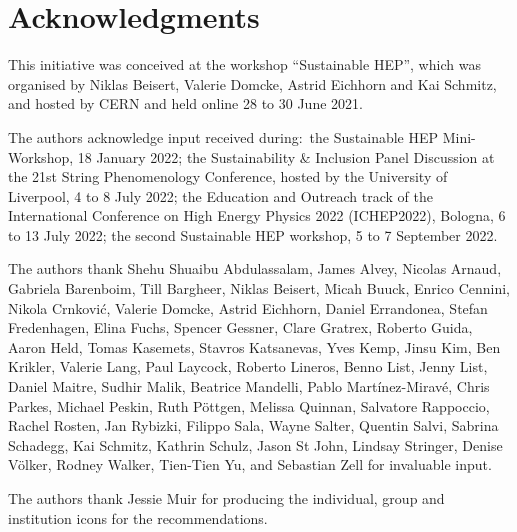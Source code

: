 \documentclass[../SustainableHEP.tex]{subfiles}
\begin{document}
\newpage


\section*{Acknowledgments}
\label{sec:Acknowledgments}
\RaggedRight
\sloppy

This initiative was conceived at the workshop “Sustainable HEP”, which was organised by Niklas Beisert, Valerie Domcke, Astrid Eichhorn and Kai Schmitz, and hosted by CERN and held online 28 to 30 June 2021.

The authors acknowledge input received during:~the Sustainable HEP Mini-Workshop, 18 January 2022; the Sustainability \& Inclusion Panel Discussion at the 21st String Phenomenology Conference, hosted by the University of Liverpool, 4 to 8 July 2022; the Education and Outreach track of the International Conference on High Energy Physics 2022 (ICHEP2022), Bologna, 6 to 13 July 2022; the second Sustainable HEP workshop, 5 to 7 September 2022.

The authors thank Shehu Shuaibu Abdulassalam, James Alvey, Nicolas Arnaud, Gabriela Barenboim, Till Bargheer, Niklas Beisert, Micah Buuck, Enrico Cennini, Nikola Crnkovi\'{c}, Valerie Domcke, Astrid Eichhorn, Daniel Errandonea, Stefan Fredenhagen, Elina Fuchs, Spencer Gessner, Clare Gratrex, Roberto Guida, Aaron Held, Tomas Kasemets, Stavros Katsanevas, Yves Kemp, Jinsu Kim, Ben Krikler, Valerie Lang, Paul Laycock, Roberto Lineros, Benno List, Jenny List, Daniel Maitre, Sudhir Malik, Beatrice Mandelli, Pablo Mart\'{i}nez-Mirav\'{e}, Chris Parkes, Michael Peskin, Ruth Pöttgen, Melissa Quinnan, Salvatore Rappoccio, Rachel Rosten, Jan Rybizki, Filippo Sala, Wayne Salter, Quentin Salvi, Sabrina Schadegg, Kai Schmitz, Kathrin Schulz, Jason St John, Lindsay Stringer, Denise V\"{o}lker, Rodney Walker, Tien-Tien Yu, and Sebastian Zell for invaluable input.

The authors thank Jessie Muir for producing the individual, group and institution icons for the recommendations.
\end{document}
